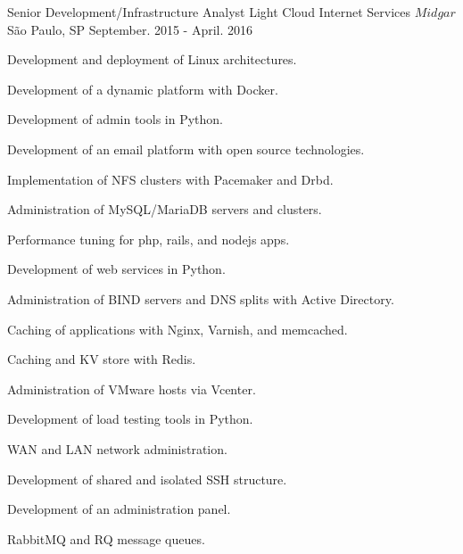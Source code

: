 \begin{cventries}
  \cventry
  {Senior Development/Infrastructure Analyst} %
  {Light Cloud Internet Services \(Midgar\)} %
  {São Paulo, SP} %
  {September. 2015 - April. 2016} %
  {
    \begin{cvitems} %
      \item {Development and deployment of Linux architectures.}
      \item {Development of a dynamic platform with Docker.}
      \item {Development of admin tools in Python.}
      \item {Development of an email platform with open source technologies.}
      \item {Implementation of NFS clusters with Pacemaker and Drbd.}
      \item {Administration of MySQL/MariaDB servers and clusters.}
      \item {Performance tuning for php, rails, and nodejs apps.}
      \item {Development of web services in Python.}
      \item {Administration of BIND servers and DNS splits with Active Directory.}
      \item {Caching of applications with Nginx, Varnish, and memcached.}
      \item {Caching and KV store with Redis.}
      \item {Administration of VMware hosts via Vcenter.}
      \item {Development of load testing tools in Python.}
      \item {WAN and LAN network administration.}
      \item {Development of shared and isolated SSH structure.}
      \item {Development of an administration panel.}
      \item {RabbitMQ and RQ message queues.}
    \end{cvitems}
  }


\end{cventries}

